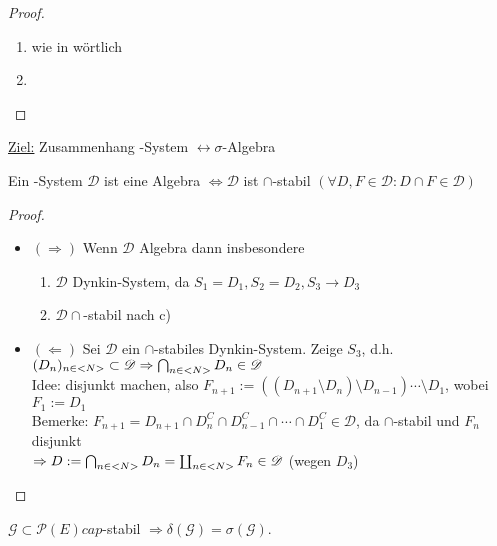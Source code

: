 \begin{proof}
	\begin{enumerate}[label=(\alph*)]
		\item wie in  wörtlich
		\item 
	\end{enumerate}
\end{proof}

\underline{Ziel:} Zusammenhang -System $\leftrightarrow \sigma$-Algebra 
\leftri
\begin{lemma}
	Ein -System $\mathscr{D}$ ist eine Algebra $\Leftrightarrow \mathscr{D}$ ist $\cap$-stabil $(\forall D,F \in \mathscr{D}\colon D \cap F \in \mathscr{D})$  
\end{lemma}

\begin{proof}
	\begin{itemize}
		\item $(\Rightarrow)$ Wenn $\mathscr{D}$ Algebra dann insbesondere
			\begin{enumerate}[label=(\alph*)]
				\item $\mathscr{D}$ Dynkin-System, da $S_1=D_1, S_2=D_2, S_3 \to D_3$
				\item $\mathscr{D} \cap$-stabil nach c)
			\end{enumerate}
		\item $(\Leftarrow)$ Sei $\mathscr{D}$ ein $\cap$-stabiles Dynkin-System. Zeige $S_3$, d.h. $(D_n)_{n\in <N>} \subset \mathscr{D} \Rightarrow \bigcap_{n\in <N>} D_n \in \mathscr{D}$\\
		Idee: disjunkt machen, also $F_{n+1} := ((D_{n+1}\setminus D_n)\setminus D_{n-1})\cdots \setminus D_1$, wobei $F_1 := D_1$\\
		Bemerke: $F_{n+1} = D_{n+1} \cap D_n^C \cap D_{n-1}^C \cap \cdots \cap D_1^C \in \mathscr{D}$, da $\cap$-stabil und $F_n$ disjunkt\\
		$\Rightarrow D:= \bigcap_{n\in <N>} D_n = \coprod_{n \in <N>} F_n \in \mathscr{D}$ (wegen $D_3$)
		\end{itemize}
\end{proof}

\begin{proposition}
	$\mathscr{G} \subset \mathscr{P}(E) cap$-stabil $\Rightarrow \delta(\mathscr{G}) = \sigma(\mathscr{G})$.
\end{proposition}

